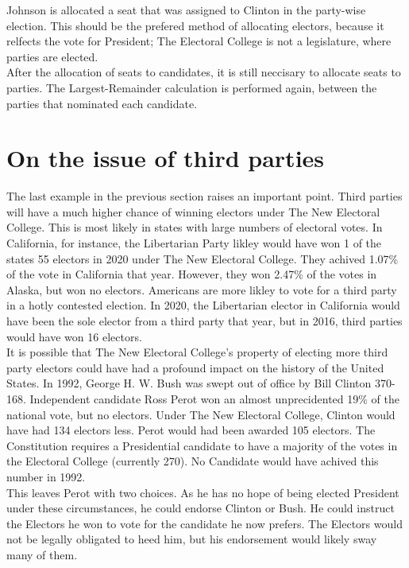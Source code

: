 \documentclass{article}
\begin{document}
    Johnson is allocated a seat that was assigned to Clinton in the party-wise election. This should be the prefered method of allocating electors, because it relfects the vote for President; The Electoral College is not a legislature, where parties are elected.\\
    
    After the allocation of seats to candidates, it is still neccisary to allocate seats to parties. The Largest-Remainder calculation is performed again, between the parties that nominated each candidate.

    \section{On the issue of third parties}%

    The last example in the previous section raises an important point. Third parties will have a much higher chance of winning electors under The New Electoral College. This is most likely in states with large numbers of electoral votes. In California, for instance, the Libertarian Party likley would have won 1 of the states 55 electors in 2020 under The New Electoral College. They achived 1.07\% of the vote in California that year. However, they won 2.47\% of the votes in Alaska, but won no electors. Americans are more likley to vote for a third party in a hotly contested election. In 2020, the Libertarian elector in California would have been the sole elector from a third party that year, but in 2016, third parties would have won 16 electors.\\

    It is possible that The New Electoral College's property of electing more third party electors could have had a profound impact on the history of the United States. In 1992, George H. W. Bush was swept out of office by Bill Clinton 370-168. Independent candidate Ross Perot won an almost unprecidented 19\% of the national vote, but no electors. Under The New Electoral College, Clinton would have had 134 electors less. Perot would had been awarded 105 electors. The Constitution requires a Presidential candidate to have a majority of the votes in the Electoral College (currently 270). No Candidate would have achived this number in 1992.\\
    
    This leaves Perot with two choices. As he has no hope of being elected President under these circumstances, he could endorse Clinton or Bush. He could instruct the Electors he won to vote for the candidate he now prefers. The Electors would not be legally obligated to heed him, but his endorsement would likely sway many of them.\\
    
\end{document}
